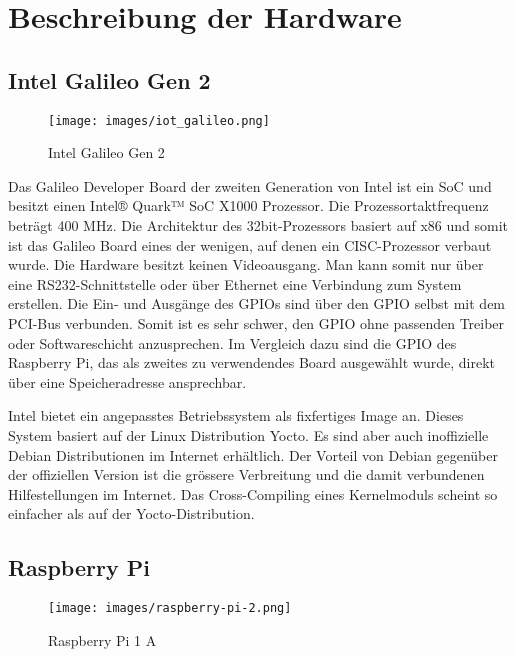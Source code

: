 \pagebreak
\section{Beschreibung der Hardware}
\label{beschreibung_hardware}
\subsection{Intel Galileo Gen 2}

\begin{wrapfigure}[14]{R}{0.6\textwidth}
\centering
\texttt{[image: images/iot\_galileo.png]}
\caption{Intel Galileo Gen 2\cite{intel_galileo_image}}
\label{fig:Intel Galileo Gen2}
\end{wrapfigure}

Das Galileo Developer Board\cite{intel_datasheet_galileo} der zweiten Generation von
Intel ist ein SoC und besitzt einen Intel® Quark™ SoC X1000 Prozessor. Die Prozessortaktfrequenz beträgt 400 MHz. Die Architektur des 32bit-Prozessors basiert auf x86\cite{intel_datasheet} und somit ist das Galileo
Board eines der wenigen, auf denen ein CISC-Prozessor verbaut wurde. Die Hardware
besitzt keinen Videoausgang. Man kann somit nur über eine RS232-Schnittstelle oder über Ethernet
eine Verbindung zum System erstellen. Die Ein- und Ausgänge des GPIOs sind über den GPIO selbst mit dem
PCI-Bus verbunden. Somit ist es sehr schwer, den GPIO ohne passenden Treiber oder
Softwareschicht anzusprechen. Im Vergleich dazu sind die GPIO des Raspberry Pi, das als zweites zu verwendendes Board ausgewählt wurde, direkt über eine Speicheradresse ansprechbar.
\par
Intel bietet ein angepasstes Betriebssystem als fixfertiges Image an. Dieses System basiert auf
der Linux Distribution Yocto. Es sind aber auch inoffizielle Debian Distributionen im
Internet erhältlich. Der Vorteil von Debian gegenüber der offiziellen Version ist die
grössere Verbreitung und die damit verbundenen Hilfestellungen im Internet. Das Cross-Compiling eines Kernelmoduls scheint so einfacher als auf der Yocto-Distribution.


\subsection{Raspberry Pi}


\begin{wrapfigure}[18]{R}{0.6\textwidth}
\centering
\texttt{[image: images/raspberry-pi-2.png]}
\caption{Raspberry Pi 1 A\cite{raspberry_image}}
\label{fig:Raspberry Pi 1 A}
\end{wrapfigure}


